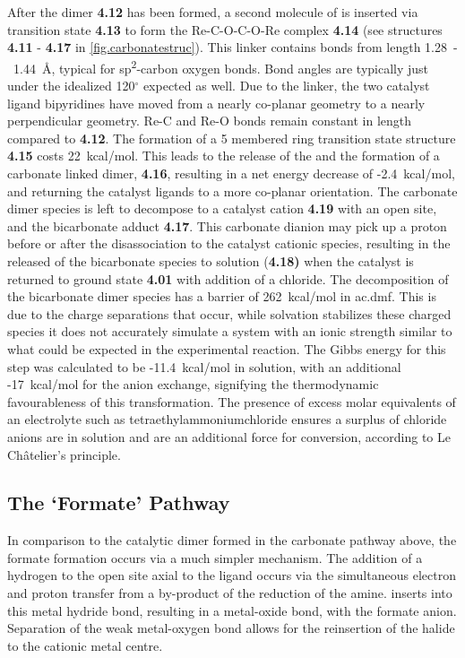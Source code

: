 After the dimer \textbf{4.12} has been formed, a second molecule of  is inserted via transition state \textbf{4.13} to form the Re-C-O-C-O-Re complex \textbf{4.14} (see structures \textbf{4.11} - \textbf{4.17} in \autoref{fig.carbonatestruc}). This linker contains bonds from length 1.28~-~1.44~\r{A}, typical for sp\textsuperscript{2}-carbon oxygen bonds. Bond angles are typically just under the idealized 120$^\circ$ expected as well. Due to the linker, the two catalyst ligand bipyridines have moved from a nearly co-planar geometry to a nearly perpendicular geometry. Re-C and Re-O bonds remain constant in length compared to \textbf{4.12}. The formation of a 5 membered ring transition state structure \textbf{4.15} costs 22~kcal/mol. This leads to the release of the  and the formation of a carbonate linked dimer, \textbf{4.16}, resulting in a net energy decrease of -2.4~kcal/mol, and returning the catalyst ligands to a more co-planar orientation. The carbonate dimer species is left to decompose to a catalyst cation \textbf{4.19} with an open site, and the bicarbonate adduct \textbf{4.17}. This carbonate dianion may pick up a proton before or after the disassociation to the catalyst cationic species, resulting in the released of the bicarbonate species to solution (\textbf{4.18)} when the catalyst is returned to ground state \textbf{4.01} with addition of a chloride. The decomposition of the bicarbonate dimer species has a barrier of 262~kcal/mol in \gls{ac.dmf}. This is due to the charge separations that occur, while solvation stabilizes these charged species it does not accurately simulate a system with an ionic strength similar to what could be expected in the experimental reaction. The Gibbs energy for this step was calculated to be -11.4~kcal/mol in solution, with an additional -17~kcal/mol for the anion exchange, signifying the thermodynamic favourableness of this transformation. The presence of excess molar equivalents of an electrolyte such as tetraethylammoniumchloride ensures a surplus of chloride anions are in solution and are an additional force for conversion, according to Le Ch\^{a}telier's principle.

\subsection{The `Formate' Pathway}\label{ss.formate}
In comparison to the catalytic dimer formed in the carbonate pathway above, the formate formation occurs via a much simpler mechanism. The addition of a hydrogen to the open site axial to the ligand occurs via the simultaneous electron and proton transfer from a by-product of the reduction of the amine.  inserts into this metal hydride bond, resulting in a metal-oxide bond, with the formate anion\autocite{creutz2007}. Separation of the weak metal-oxygen bond allows for the reinsertion of the halide to the cationic metal centre. 


